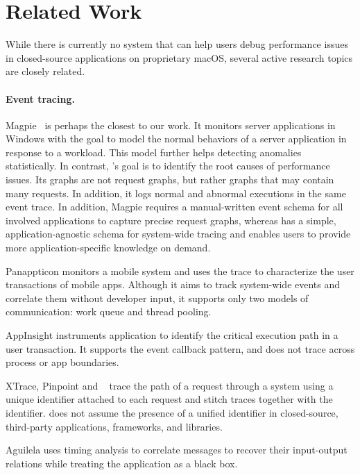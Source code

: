 \section{Related Work}
\label{sec:related-work}

While there is currently no system that can help users debug performance
issues in closed-source applications on proprietary macOS, several active
research topics are closely related.

\paragraph{Event tracing.}  Magpie~\cite{barham2004using} is perhaps the closest to
our work.  It monitors server applications in Windows with the goal to model
the normal behaviors of a server application in response to a workload.  This
model further helps detecting anomalies statistically.  In contrast, \xxx's
goal is to identify the root causes of performance issues.  Its graphs are not
request graphs, but rather graphs that may contain many requests.  In addition,
it logs normal and abnormal executions in the same event trace.  In addition,
Magpie requires a manual-written event schema for all involved applications to
capture precise request graphs, whereas \xxx has a simple, application-agnostic
schema for system-wide tracing and enables users to provide more
application-specific knowledge on demand.

Panappticon \cite{zhang2013panappticon} monitors a mobile system and uses the
trace to characterize the user transactions of mobile apps.  Although it
aims to track system-wide events and correlate them without developer
input, it supports only two models of communication: work queue and thread
pooling.

AppInsight \cite{ravindranath2012appinsight} instruments application to
identify the critical execution path in a user transaction.  It supports the
event callback pattern, and does not trace across process or app boundaries.

XTrace, Pinpoint and \etc ~\cite{fonseca2007x, chen2002pinpoint,
chow2014mystery} trace the path of a request through a system using a unique
identifier attached to each request and stitch traces together with the
identifier.  \xxx does not assume the presence of a unified identifier in
closed-source, third-party applications, frameworks, and libraries.

Aguilela \cite{aguilera2003performance} uses timing analysis to correlate
messages to recover their input-output relations while treating the application
as a black box.

